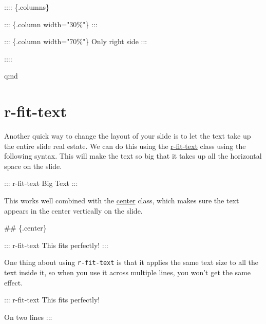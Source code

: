 \documentclass[
  letterpaper,
  DIV=11,
  numbers=noendperiod]{scrreprt}
\newenvironment{Shaded}{\begin{snugshade}}{\end{snugshade}}
\newcommand{\FunctionTok}[1]{\textcolor[rgb]{0.28,0.35,0.67}{#1}}
\newcommand{\NormalTok}[1]{\textcolor[rgb]{0.00,0.23,0.31}{#1}}
\begin{document}
\begin{Shaded}
\begin{Highlighting}[]
\NormalTok{:::: \{.columns\}}

\NormalTok{::: \{.column width="30\%"\}}
\NormalTok{:::}

\NormalTok{::: \{.column width="70\%"\}}
\NormalTok{Only right side}
\NormalTok{:::}

\NormalTok{::::}
\end{Highlighting}
\end{Shaded}

qmd

\section{r-fit-text}\label{r-fit-text}

Another quick way to change the layout of your slide is to let the text
take up the entire slide real estate. We can do this using the
\href{https://quarto.org/docs/presentations/revealjs/advanced.html\#fit-text}{r-fit-text}
class using the following syntax. This will make the text so big that it
takes up all the horizontal space on the slide.

\begin{Shaded}
\begin{Highlighting}[]
\NormalTok{::: r{-}fit{-}text}
\NormalTok{Big Text}
\NormalTok{:::}
\end{Highlighting}
\end{Shaded}

This works well combined with the
\href{https://quarto.org/docs/presentations/revealjs/advanced.html\#center}{center}
class, which makes sure the text appears in the center vertically on the
slide.

\begin{Shaded}
\begin{Highlighting}[]
\FunctionTok{\#\# \{.center\}}

\NormalTok{::: r{-}fit{-}text}
\NormalTok{This fits perfectly!}
\NormalTok{:::}
\end{Highlighting}
\end{Shaded}

One thing about using \texttt{r-fit-text} is that it applies the same
text size to all the text inside it, so when you use it across multiple
lines, you won't get the same effect.

\begin{Shaded}
\begin{Highlighting}[]
\NormalTok{::: r{-}fit{-}text}
\NormalTok{This fits perfectly!}

\NormalTok{On two lines}
\NormalTok{:::}
\end{Highlighting}
\end{Shaded}
\end{document}
